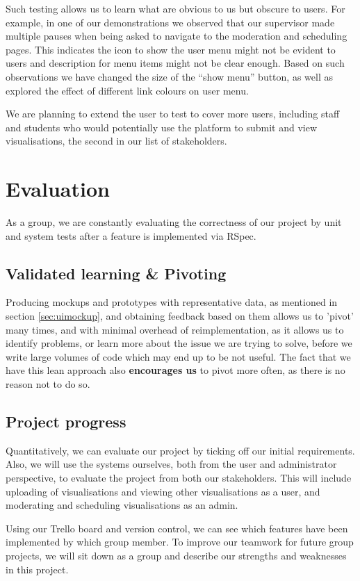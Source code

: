 \documentclass[a4paper]{article}
\begin{document}
Such testing allows us to learn what are obvious to us but obscure to users.
For example, in one of our demonstrations we observed that our supervisor 
made multiple pauses when
being asked to navigate to the moderation and scheduling pages. This 
indicates the icon to show the user menu might not be evident to users and
description for menu items might not be clear enough. Based on such observations
we have changed the size of the ``show menu'' button, as well as explored the effect
of different link colours on user menu.

We are planning to extend the user to test to cover more users, including staff
and students who would potentially use the platform to submit and 
view visualisations, the second in our list of stakeholders.

\section{Evaluation}
As a group, we are constantly evaluating the correctness of our project by 
unit and system tests after a feature is implemented via RSpec. 



\subsection{Validated learning \& Pivoting}
Producing mockups and prototypes with representative data, as mentioned
in section \ref{sec:uimockup}, and obtaining feedback based on them allows
us to 'pivot' many times, and with minimal overhead
of reimplementation, as it allows us to identify problems, or learn more about
the issue we are trying to solve, before we write large volumes of code which
may end up to be not useful. The fact that we have this lean approach also
\textbf{encourages us} to pivot more often, as there is no reason not to do so.

\subsection{Project progress}

Quantitatively, we can evaluate our project by ticking off our initial 
requirements. Also, we will use the systems ourselves, both from the user 
and administrator perspective, to evaluate the project from both our stakeholders.
This will include uploading of visualisations and viewing other visualisations as a
user, and moderating and scheduling visualisations as an admin.

Using our Trello board and version control, we can see which features have been 
implemented by which group member. To improve our teamwork for future group 
projects, we will sit down as a group and describe our strengths and weaknesses in 
this project.



\end{document}
